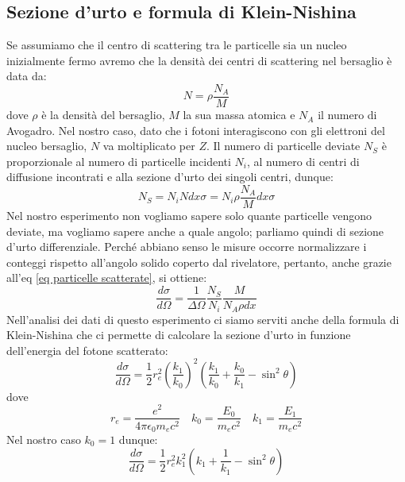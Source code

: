\subsection{Sezione d'urto e formula di Klein-Nishina}
Se assumiamo che il centro di scattering tra le particelle sia un nucleo inizialmente fermo avremo che la densità dei centri di scattering nel bersaglio è data da:
\begin{equation}
    N = \rho \frac{N_{A}}{M}
\end{equation}
dove $\rho$ è la densità del bersaglio, $M$ la sua massa atomica e $N_{A}$ il numero di Avogadro. Nel nostro caso, dato che i fotoni interagiscono con gli elettroni del nucleo bersaglio, $N$ va moltiplicato per $Z$. Il numero di particelle deviate $N_{S}$ è proporzionale al numero di particelle incidenti $N_{i}$, al numero di centri di diffusione incontrati e alla sezione d'urto dei singoli centri, dunque:
\begin{equation}
    N_{S} = N_{i} N dx \sigma = N_{i} \rho \frac{N_{A}}{M} dx \sigma
\label{eq particelle scatterate}
\end{equation}
Nel nostro esperimento non vogliamo sapere solo quante particelle vengono deviate, ma vogliamo sapere anche a quale angolo; parliamo quindi di sezione d'urto differenziale. Perché abbiano senso le misure occorre normalizzare i conteggi rispetto all'angolo solido coperto dal rivelatore, pertanto, anche grazie all'eq \eqref{eq particelle scatterate}, si ottiene:
\begin{equation}
    \frac{d\sigma}{d\Omega} = \frac{1}{\Delta\Omega} \frac{N_{S}}{N_{i}} \frac{M}{N_{A} \rho dx}
\label{eq sezione d'urto conteggi}
\end{equation}
Nell'analisi dei dati di questo esperimento ci siamo serviti anche della formula di Klein-Nishina che ci permette di calcolare la sezione d'urto in funzione dell'energia del fotone scatterato:
\begin{equation}
    \frac{d\sigma}{d\Omega} = \frac{1}{2} r_{e}^{2} \left(\frac{k_{1}}{k_{0}}\right)^{2} \left(\frac{k_{1}}{k_{0}} + \frac{k_{0}}{k_{1}} - \sin^{2}{\theta}\right)
\end{equation}
dove
\begin{equation}
    r_{e} = \frac{e^{2}}{4 \pi \epsilon_{0} m_{e} c^{2}} \quad k_{0} = \frac{E_{0}}{m_{e} c^{2}} \quad k_{1} = \frac{E_{1}}{m_{e} c^{2}}
\end{equation}
Nel nostro caso $k_{0} = 1$ dunque:
\begin{equation}
    \frac{d\sigma}{d\Omega} = \frac{1}{2} r_{e}^{2} k_{1}^{2} \left(k_{1} + \frac{1}{k_{1}} - \sin^{2}{\theta}\right)
\label{eq sezione d'urto Klein-Nishina}    
\end{equation}

